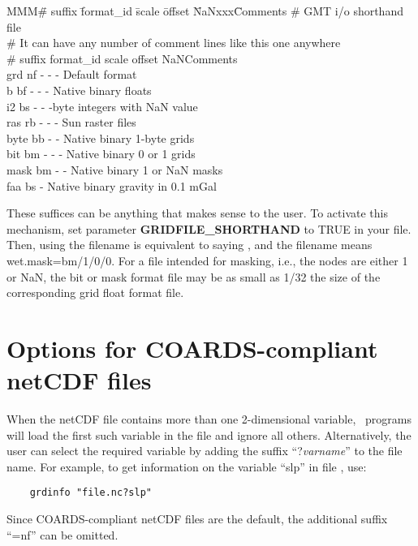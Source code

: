 \noindent
\begin{tabbing}
MMM\=\# suffix \=format\_id \=scale \=offset \=NaNxxx\=Comments \kill 
\>\# GMT i/o shorthand file \\ 
\>\# It can have any number of comment lines like this one anywhere \\
\>\# suffix \> format\_id	\> scale \> offset \>NaN\>Comments \\ 
\>grd \> nf \> - \> - \> - \>Default format \\ 
\>b \> bf \> - \> - \> - \> Native binary floats \\ 
\>i2 \> bs \> - \> -  -byte integers with NaN value \\ 
\>ras \> rb \> - \> - \> - \> Sun raster files \\ 
\>byte \> bb \> - \> -  \> Native binary 1-byte grids \\ 
\>bit \> bm \> - \> - \> - \> Native binary 0 or 1 grids \\ 
\>mask \> bm \> - \> -  \> Native binary 1 or NaN masks \\ 
\>faa \> bs  \> -  \> Native binary gravity in 0.1 mGal
\end{tabbing} 

These suffices can be anything that makes sense to the user.  To
activate this mechanism, set parameter \textbf{GRIDFILE\_SHORTHAND} to TRUE in
your  file.  Then, using the filename
 is equivalent to saying ,
and the filename  means wet.mask=bm/1/0/0.  For a
file intended for masking, i.e., the nodes are either 1 or NaN,
the bit or mask format file may be as small as 1/32 the size of the
corresponding grid float format file. 

\section{Options for COARDS-compliant netCDF files}
\label{sec:netcdf}

When the netCDF file contains more than one 2-dimensional variable, \GMT\ programs
will load the first such variable in the file and ignore all others. Alternatively,
the user can select the
required variable by adding the suffix ``?\emph{varname}'' to the file name. For example,
to get information on the variable ``slp'' in file , use:
\begin{verbatim}
	grdinfo "file.nc?slp"
\end{verbatim}
Since COARDS-compliant netCDF files are the default, the additional suffix ``=nf'' can be omitted.

